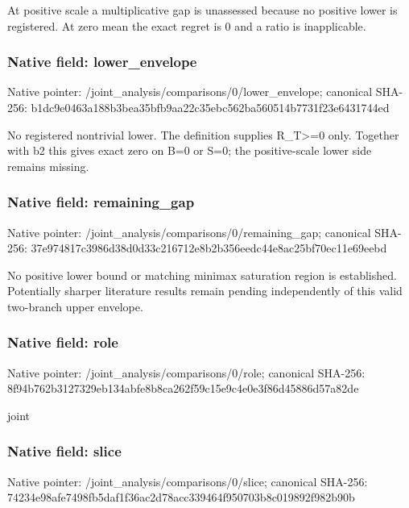 \documentclass[10pt,a4paper]{article}
\begin{document}
\begingroup\raggedright\sloppy At positive scale a multiplicative gap is unassessed because no positive lower is registered. At zero mean the exact regret is 0 and a ratio is inapplicable.\par\endgroup

\subsubsection{Native field: lower\_\allowbreak{}envelope}
Native pointer: /joint\_\allowbreak{}analysis/comparisons/0/lower\_\allowbreak{}envelope; canonical SHA-256: b1dc9e0463a188b3bea35bfb9aa22c35ebc562ba560514b7731f23e6431744ed

\begingroup\raggedright\sloppy No registered nontrivial lower. The definition supplies R\_\allowbreak{}T>=\allowbreak{}0 only. Together with b2 this gives exact zero on B=\allowbreak{}0 or S=\allowbreak{}0;\allowbreak{} the positive-scale lower side remains missing.\par\endgroup

\subsubsection{Native field: remaining\_\allowbreak{}gap}
Native pointer: /joint\_\allowbreak{}analysis/comparisons/0/remaining\_\allowbreak{}gap; canonical SHA-256: 37e974817c3986d38d0d33c216712e8b2b356eedc44e8ac25bf70ec11e69eebd

\begingroup\raggedright\sloppy No positive lower bound or matching minimax saturation region is established. Potentially sharper literature results remain pending independently of this valid two-branch upper envelope.\par\endgroup

\subsubsection{Native field: role}
Native pointer: /joint\_\allowbreak{}analysis/comparisons/0/role; canonical SHA-256: 8f94b762b3127329eb134abfe8b8ca262f59c15e9c4e0e3f86d45886d57a82de

\begingroup\raggedright\sloppy joint\par\endgroup

\subsubsection{Native field: slice}
Native pointer: /joint\_\allowbreak{}analysis/comparisons/0/slice; canonical SHA-256: 74234e98afe7498fb5daf1f36ac2d78acc339464f950703b8c019892f982b90b
\end{document}

